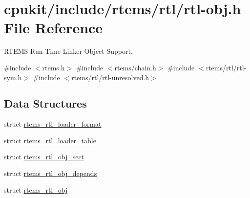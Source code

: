 \hypertarget{rtl-obj_8h}{}\section{cpukit/include/rtems/rtl/rtl-\/obj.h File Reference}
\label{rtl-obj_8h}


R\+T\+E\+MS Run-\/\+Time Linker Object Support.  


{\ttfamily \#include $<$rtems.\+h$>$}\newline
{\ttfamily \#include $<$rtems/chain.\+h$>$}\newline
{\ttfamily \#include $<$rtems/rtl/rtl-\/sym.\+h$>$}\newline
{\ttfamily \#include $<$rtems/rtl/rtl-\/unresolved.\+h$>$}\newline
\subsection*{Data Structures}
\begin{DoxyCompactItemize}
\item 
struct \mbox{\hyperlink{structrtems__rtl__loader__format}{rtems\+\_\+rtl\+\_\+loader\+\_\+format}}
\item 
struct \mbox{\hyperlink{structrtems__rtl__loader__table}{rtems\+\_\+rtl\+\_\+loader\+\_\+table}}
\item 
struct \mbox{\hyperlink{structrtems__rtl__obj__sect}{rtems\+\_\+rtl\+\_\+obj\+\_\+sect}}
\item 
struct \mbox{\hyperlink{structrtems__rtl__obj__depends}{rtems\+\_\+rtl\+\_\+obj\+\_\+depends}}
\item 
struct \mbox{\hyperlink{structrtems__rtl__obj}{rtems\+\_\+rtl\+\_\+obj}}
\end{DoxyCompactItemize}
